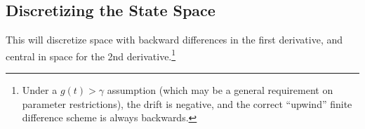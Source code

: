 \documentclass[11pt]{article}
\newcommand{\D}[1][]{\ensuremath{\boldsymbol{\partial}_{#1}}}
\newcommand{\diff}{\ensuremath{\mathrm{d}}}
\begin{document}

\subsection{Discretizing the State Space}\label{eq:discretization}
This will discretize space with backward differences in the first derivative, and central in space for the 2nd derivative.\footnote{Under a $g(t) > \gamma$ assumption (which may be a general requirement on parameter restrictions), the drift is negative, and the correct ``upwind'' finite difference scheme is always backwards.}
\end{document}
